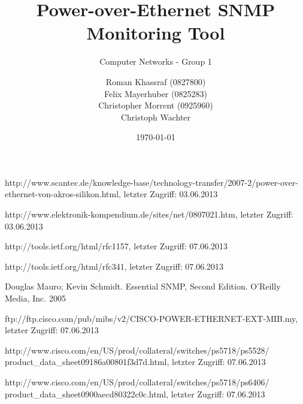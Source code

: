 \documentclass[a4paper, 12pt]{scrartcl}
\title{Power-over-Ethernet SNMP Monitoring Tool}
\subtitle{Computer Networks - Group 1}
\author{Roman Khassraf (0827800)\\ Felix Mayerhuber (0825283) \\ Christopher Morrent (0925960) \\ Christoph Wachter }
\date{\today}
\begin{document}
\maketitle







\begin{thebibliography}{4}

 http://www.scantec.de/knowledge-base/technology-transfer/2007-2/power-over-ethernet-von-akros-silikon.html, letzter Zugriff: 03.06.2013

 http://www.elektronik-kompendium.de/sites/net/0807021.htm, letzter Zugriff: 03.06.2013

 http://tools.ietf.org/html/rfc1157, letzter Zugriff: 07.06.2013

 http://tools.ietf.org/html/rfc341, letzter Zugriff: 07.06.2013

 Douglas Mauro; Kevin Schmidt. Essential SNMP, Second Edition. O'Reilly Media, Inc. 2005

 ftp://ftp.cisco.com/pub/mibs/v2/CISCO-POWER-ETHERNET-EXT-MIB.my, letzter Zugriff: 07.06.2013

 http://www.cisco.com/en/US/prod/collateral/switches/ps5718/ps5528/\\product\_data\_sheet09186a00801f3d7d.html, letzter Zugriff: 07.06.2013

 http://www.cisco.com/en/US/prod/collateral/switches/ps5718/ps6406/\\product\_data\_sheet0900aecd80322c0c.html, letzter Zugriff: 07.06.2013

\end{thebibliography}
\end{document}
